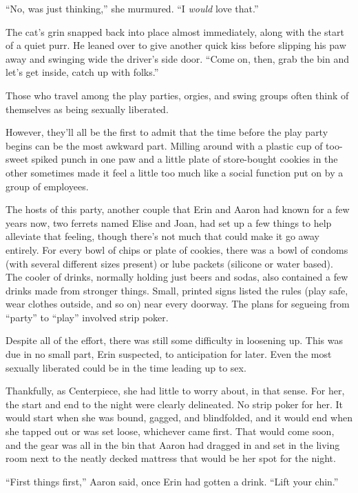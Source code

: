 ``No, was just thinking,'' she murmured. ``I \textit{would} love that.''

The cat's grin snapped back into place almost immediately, along with the start of a quiet purr. He leaned over to give another quick kiss before slipping his paw away and swinging wide the driver's side door. ``Come on, then, grab the bin and let's get inside, catch up with folks.''

\secdiv

Those who travel among the play parties, orgies, and swing groups often think of themselves as being sexually liberated.

However, they'll all be the first to admit that the time before the play party begins can be the most awkward part. Milling around with a plastic cup of too-sweet spiked punch in one paw and a little plate of store-bought cookies in the other sometimes made it feel a little too much like a social function put on by a group of employees.

The hosts of this party, another couple that Erin and Aaron had known for a few years now, two ferrets named Elise and Joan, had set up a few things to help alleviate that feeling, though there's not much that could make it go away entirely. For every bowl of chips or plate of cookies, there was a bowl of condoms (with several different sizes present) or lube packets (silicone or water based). The cooler of drinks, normally holding just beers and sodas, also contained a few drinks made from stronger things. Small, printed signs listed the rules (play safe, wear clothes outside, and so on) near every doorway. The plans for segueing from ``party'' to ``play'' involved strip poker.

Despite all of the effort, there was still some difficulty in loosening up. This was due in no small part, Erin suspected, to anticipation for later. Even the most sexually liberated could be in the time leading up to sex.

Thankfully, as Centerpiece, she had little to worry about, in that sense. For her, the start and end to the night were clearly delineated. No strip poker for her. It would start when she was bound, gagged, and blindfolded, and it would end when she tapped out or was set loose, whichever came first. That would come soon, and the gear was all in the bin that Aaron had dragged in and set in the living room next to the neatly decked mattress that would be her spot for the night.

``First things first,'' Aaron said, once Erin had gotten a drink. ``Lift your chin.''

